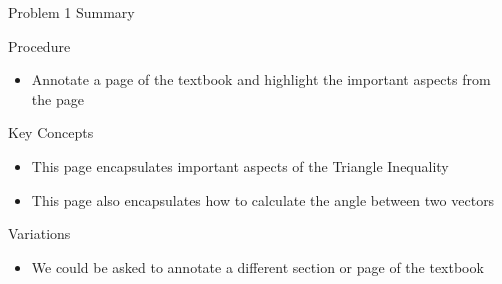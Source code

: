 \begin{summary}{Problem 1 Summary}
    \begin{statement}{Procedure}
        \begin{itemize}
            \item Annotate a page of the textbook and highlight the important aspects from the page
        \end{itemize}
    \end{statement}
    \begin{statement}{Key Concepts}
        \begin{itemize}
            \item This page encapsulates important aspects of the Triangle Inequality
            \item This page also encapsulates how to calculate the angle between two vectors
        \end{itemize}
    \end{statement}
    \begin{statement}{Variations}
        \begin{itemize}
            \item We could be asked to annotate a different section or page of the textbook
        \end{itemize}
    \end{statement}
\end{summary}

